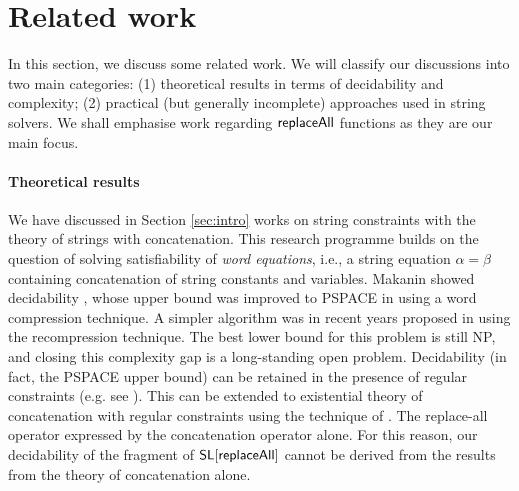 
\section{Related work}\label{sec-rel}

 
In this section, we discuss some related work. We will classify our discussions into two main categories: (1) theoretical results in terms of decidability and complexity; (2) practical (but generally incomplete) approaches used in string solvers.  We shall emphasise work regarding $\mathsf{replaceAll}$ functions as they are our main focus. 

\paragraph{Theoretical results}
We have discussed in Section \ref{sec:intro} works on string constraints with 
the theory of strings with concatenation. This research programme builds on
the question of solving satisfiability of \emph{word equations}, i.e., a
string equation $\alpha = \beta$ containing concatenation of string constants
and variables. Makanin showed decidability \cite{Makanin}, whose upper bound
was improved to PSPACE in \cite{P04} using a word compression technique. 
A simpler algorithm was in recent years proposed in \cite{J17} using
the recompression technique. The best lower bound for this problem is still NP,
and closing this complexity gap is a long-standing open problem. Decidability
(in fact, the PSPACE upper bound) can be retained in the presence of regular
constraints (e.g. see \cite{Schulz}). This can be extended to existential theory
of concatenation with regular constraints using the technique of \cite{buchi}.
The replace-all operator expressed by the concatenation operator alone. For 
this reason, our decidability of the fragment of $\mathsf{SL}[\mathsf{replaceAll}]$ cannot
be derived from the results from the theory of concatenation alone.


